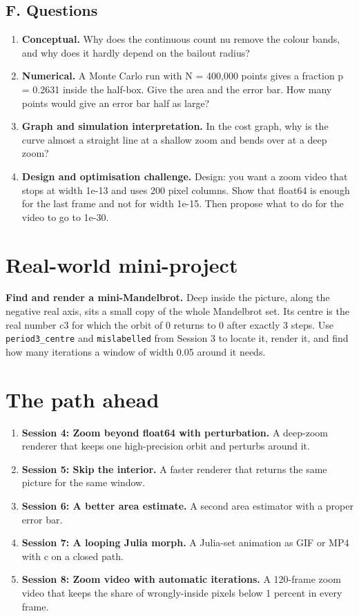 \documentclass[11pt,a4paper]{article}
\begin{document}
\subsection*{F. Questions}
\begin{enumerate}[nosep]
\item \textbf{Conceptual.} Why does the continuous count nu remove the colour bands, and why does it hardly depend on the bailout radius?
\item \textbf{Numerical.} A Monte Carlo run with N = 400,000 points gives a fraction p = 0.2631 inside the half-box. Give the area and the error bar. How many points would give an error bar half as large?
\item \textbf{Graph and simulation interpretation.} In the cost graph, why is the curve almost a straight line at a shallow zoom and bends over at a deep zoom?
\item \textbf{Design and optimisation challenge.} Design: you want a zoom video that stops at width 1e-13 and uses 200 pixel columns. Show that float64 is enough for the last frame and not for width 1e-15. Then propose what to do for the video to go to 1e-30.
\end{enumerate}

\section{Real-world mini-project}
\textbf{Find and render a mini-Mandelbrot.} Deep inside the picture, along the negative real axis, sits a small copy of the whole Mandelbrot set. Its centre is the real number c3 for which the orbit of 0 returns to 0 after exactly 3 steps. Use \texttt{period3\_centre} and \texttt{mislabelled} from Session 3 to locate it, render it, and find how many iterations a window of width 0.05 around it needs.

\section{The path ahead}
\begin{enumerate}[nosep]
\item \textbf{Session 4: Zoom beyond float64 with perturbation.} A deep-zoom renderer that keeps one high-precision orbit and perturbs around it.
\item \textbf{Session 5: Skip the interior.} A faster renderer that returns the same picture for the same window.
\item \textbf{Session 6: A better area estimate.} A second area estimator with a proper error bar.
\item \textbf{Session 7: A looping Julia morph.} A Julia-set animation as GIF or MP4 with c on a closed path.
\item \textbf{Session 8: Zoom video with automatic iterations.} A 120-frame zoom video that keeps the share of wrongly-inside pixels below 1 percent in every frame.
\end{enumerate}
\end{document}
